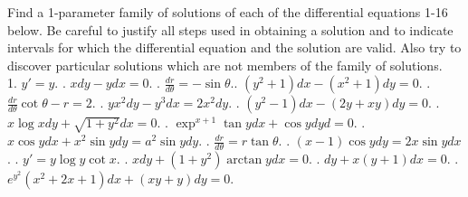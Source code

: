 \documentclass[12pt]{article}
\newenvironment{problem}[2][Problem]{\begin{trivlist}
\item[\hskip \labelsep {\bfseries #1}\hskip \labelsep {\bfseries #2.}]}{\end{trivlist}}
\begin{document}
\begin{problem}{1}
Find a 1-parameter family of solutions of each of the differential equations 1-16 below. Be careful to justify all steps used in obtaining a solution and to indicate intervals for which the differential equation and the solution are valid. Also try to discover particular solutions which are not members of the family of solutions.\\
1. $ y\prime = y $. . $ xdy-ydx=0 $. . $ \frac{dr}{d\theta} = -\sin\theta$.. $ (y^2+1)dx-(x^2+1)dy=0 $. . $ \frac{dr}{d\theta}\cot\theta - r = 2 $. . $ yx^2dy-y^3dx=2x^2dy $. . $ (y^2-1)dx-(2y+xy)dy=0 $. . $ x\log xdy+\sqrt{1+y^2}dx=0 $. . $ \exp^{x+1}\tan ydx+\cos ydyd = 0 $. . $ x\cos y dx+x^2\sin y dy = a^2\sin y dy $. . $ \frac{dr}{d\theta} = r\tan\theta$. . $(x-1)\cos y dy = 2x \sin y dx$. . $ y\prime = y\log y \cot x $. . $ xdy+(1+y^2)\arctan y dx = 0 $. . $ dy+x(y+1)dx = 0 $. . $ e^{y^2}(x^2+2x+1)dx+(xy+y)dy = 0 $.
\end{problem}
\end{document}
